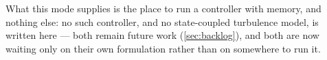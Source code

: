 What this mode supplies is the place to run a controller with memory, and nothing else: no such
controller, and no state-coupled turbulence model, is written here --- both remain future work
(\autoref{sec:backlog}), and both are now waiting only on their own formulation rather than on
somewhere to run it.
